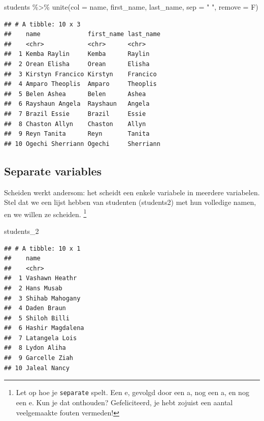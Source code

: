 \documentclass[]{tufte-book}
\newenvironment{Shaded}{}{}
\newcommand{\AttributeTok}[1]{\textcolor[rgb]{0.49,0.56,0.16}{#1}}
\newcommand{\FunctionTok}[1]{\textcolor[rgb]{0.02,0.16,0.49}{#1}}
\newcommand{\NormalTok}[1]{#1}
\newcommand{\SpecialCharTok}[1]{\textcolor[rgb]{0.25,0.44,0.63}{#1}}
\newcommand{\StringTok}[1]{\textcolor[rgb]{0.25,0.44,0.63}{#1}}
\begin{document}
\begin{Shaded}
\begin{Highlighting}[]
\NormalTok{students }\SpecialCharTok{\%\textgreater{}\%}
  \FunctionTok{unite}\NormalTok{(}\AttributeTok{col =}\NormalTok{ name, first\_name, last\_name, }\AttributeTok{sep =} \StringTok{" "}\NormalTok{, }\AttributeTok{remove =}\NormalTok{ F)}
\end{Highlighting}
\end{Shaded}

\begin{verbatim}
## # A tibble: 10 x 3
##    name             first_name last_name
##    <chr>            <chr>      <chr>    
##  1 Kemba Raylin     Kemba      Raylin   
##  2 Orean Elisha     Orean      Elisha   
##  3 Kirstyn Francico Kirstyn    Francico 
##  4 Amparo Theoplis  Amparo     Theoplis 
##  5 Belen Ashea      Belen      Ashea    
##  6 Rayshaun Angela  Rayshaun   Angela   
##  7 Brazil Essie     Brazil     Essie    
##  8 Chaston Allyn    Chaston    Allyn    
##  9 Reyn Tanita      Reyn       Tanita   
## 10 Ogechi Sherriann Ogechi     Sherriann
\end{verbatim}

\hypertarget{separate-variables}{%
\subsection{Separate variables}\label{separate-variables}}

Scheiden werkt andersom: het scheidt een enkele variabele in meerdere variabelen. Stel dat we een lijst hebben van studenten (students2) met hun volledige namen, en we willen ze scheiden. \footnote{Let op hoe je \texttt{separate} spelt. Een e, gevolgd door een a, nog een a, en nog een e. Kun je dat onthouden? Gefeliciteerd, je hebt zojuist een aantal veelgemaakte fouten vermeden!}

\begin{Shaded}
\begin{Highlighting}[]
\NormalTok{students\_2}
\end{Highlighting}
\end{Shaded}

\begin{verbatim}
## # A tibble: 10 x 1
##    name            
##    <chr>           
##  1 Vashawn Heathr  
##  2 Hans Musab      
##  3 Shihab Mahogany 
##  4 Daden Braun     
##  5 Shiloh Billi    
##  6 Hashir Magdalena
##  7 Latangela Lois  
##  8 Lydon Aliha     
##  9 Garcelle Ziah   
## 10 Jaleal Nancy
\end{verbatim}
\end{document}
